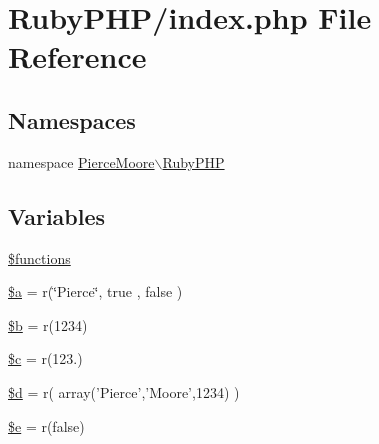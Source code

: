 \hypertarget{index_8php}{\section{Ruby\-P\-H\-P/index.php File Reference}
\label{index_8php}
}
\subsection*{Namespaces}
\begin{DoxyCompactItemize}
\item 
namespace \hyperlink{namespace_pierce_moore_1_1_ruby_p_h_p}{Pierce\-Moore$\backslash$\-Ruby\-P\-H\-P}
\end{DoxyCompactItemize}
\subsection*{Variables}
\begin{DoxyCompactItemize}
\item 
\hyperlink{namespace_pierce_moore_1_1_ruby_p_h_p_aa75daea491817f3b64daa2f51128bcdf}{\$functions}
\item 
\hyperlink{namespace_pierce_moore_1_1_ruby_p_h_p_acebf83966ef6d7e5645a6b62ba368f9f}{\$a} = r(\char`\"{}Pierce\char`\"{}, true , false )
\item 
\hyperlink{namespace_pierce_moore_1_1_ruby_p_h_p_ab9eb087b791749ae45deabb0899b7ccc}{\$b} = r(1234)
\item 
\hyperlink{namespace_pierce_moore_1_1_ruby_p_h_p_ab73d7f4f2dae233dd561e7fdaab3a77b}{\$c} = r(123.)
\item 
\hyperlink{namespace_pierce_moore_1_1_ruby_p_h_p_a0cf5dd496d9f5ff1edf00d234771dcfe}{\$d} = r( array('Pierce','Moore',1234) )
\item 
\hyperlink{namespace_pierce_moore_1_1_ruby_p_h_p_ab74076a9b7e1d23d12b9e8d65e60315a}{\$e} = r(false)
\end{DoxyCompactItemize}
